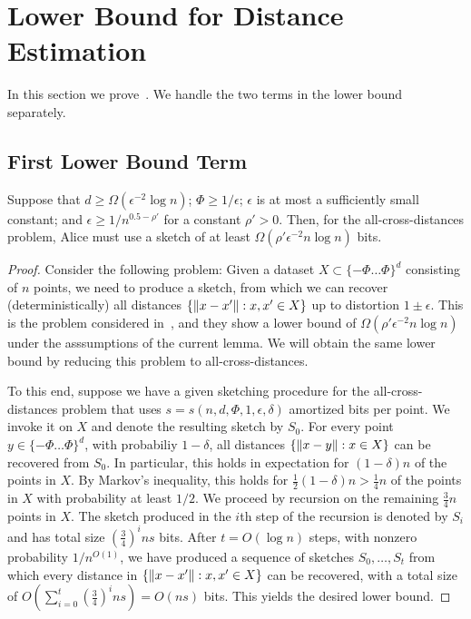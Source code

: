 
\section{Lower Bound for Distance Estimation}\label{sec:dist_lb}
In this section we prove~.
We handle the two terms in the lower bound separately.

\subsection{First Lower Bound Term}
\begin{lemma}\label{lmm:lb1}
Suppose that $d\geq\Omega(\epsilon^{-2}\log n)$; $\Phi\geq1/\epsilon$; $\epsilon$ is at most a sufficiently small constant; and $\epsilon\geq1/n^{0.5-\rho'}$ for a constant $\rho'>0$.
Then, for the all-cross-distances problem, Alice must use a sketch of at least $\Omega(\rho'\epsilon^{-2}n\log n)$ bits.
\end{lemma}
\begin{proof}
Consider the following problem: Given a dataset $X\subset\{-\Phi \ldots \Phi\}^d$ consisting of $n$ points, we need to produce a sketch, from which we can recover (deterministically) all distances $\{\lVert x-x'\rVert:x,x'\in X\}$ up to distortion $1\pm\epsilon$.
This is the problem considered in~\cite{indyk2017near}, and they show a lower bound of $\Omega(\rho'\epsilon^{-2}n\log n)$ under the asssumptions of the current lemma. We will obtain the same lower bound by reducing this problem to all-cross-distances.

To this end, suppose we have a given sketching procedure for the all-cross-distances problem that uses $s=s(n,d,\Phi,1,\epsilon,\delta)$ amortized bits per point.
We invoke it on $X$ and denote the resulting sketch by $S_0$. For every point $y\in\{-\Phi \ldots \Phi\}^d$, with probabiliy $1-\delta$, all distances $\{\lVert x-y\rVert:x\in X\}$ can be recovered from $S_0$. In particular, this holds in expectation for $(1-\delta)n$ of the points in $X$.
By Markov's inequality, this holds for $\frac12(1-\delta)n>\frac14n$ of the points in $X$ with probability at least $1/2$.
We proceed by recursion on the remaining $\frac34n$ points in $X$.
The sketch produced in the $i$th step of the recursion is denoted by $S_i$ and has total size $(\frac34)^ins$ bits.
After $t=O(\log n)$ steps, with nonzero probability $1/n^{O(1)}$, we have produced a sequence of sketches $S_0,\ldots,S_t$ from which every distance in $\{\lVert x-x'\rVert:x,x'\in X\}$ can be recovered, with a total size of $O(\sum_{i=0}^t(\frac34)^ins)=O(ns)$ bits. This yields the desired lower bound.
\end{proof}


